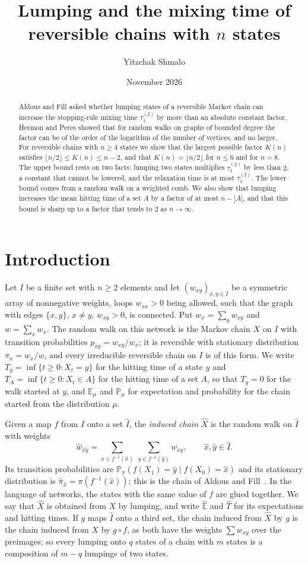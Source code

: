 \documentclass[11pt]{amsart}
\title[Lumping and the mixing time]{Lumping and the mixing time of reversible chains with $n$ states}
\author{Yitzchak Shmalo}
\date{November 2026}
\theoremstyle{definition}
\newcommand{\Prob}{\mathbb{P}}
\newcommand{\E}{\mathbb{E}}
\newcommand{\tmix}{\tau_1^{(2)}}
\newcommand{\hE}{\widehat{\E}}
\newcommand{\hw}{\widehat{w}}
\newcommand{\hpi}{\widehat{\pi}}
\newcommand{\hI}{\widehat{I}}
\newcommand{\hX}{\widehat{X}}
\begin{document}
\begin{abstract}
Aldous and Fill asked whether lumping states of a reversible Markov chain can increase the stopping-rule mixing time
$\tmix$ by more than an absolute constant factor. Hermon and Peres showed that for random walks on graphs of bounded
degree the factor can be of the order of the logarithm of the number of vertices, and no larger. For reversible
chains with $n\ge4$ states we show that the largest possible factor $K(n)$ satisfies
$\lfloor n/2\rfloor\le K(n)\le n-2$, and that $K(n)=\lfloor n/2\rfloor$ for $n\le6$ and for $n=8$. The upper bound
rests on two facts: lumping two states multiplies $\tmix$ by less than $2$, a constant that cannot be lowered, and the
relaxation time is at most $\tmix$. The lower bound comes from a random walk on a weighted comb. We also show that
lumping increases the mean hitting time of a set $A$ by a factor of at most $n-|A|$, and that this bound is sharp up to
a factor that tends to $2$ as $n\to\infty$.
\end{abstract}
\maketitle

\section{Introduction}\label{sec:intro}
Let $I$ be a finite set with $n\ge2$ elements and let $(w_{xy})_{x,y\in I}$ be a symmetric array of nonnegative
weights, loops $w_{xx}>0$ being allowed, such that the graph with edges $\{x,y\}$, $x\ne y$, $w_{xy}>0$, is connected.
Put $w_x=\sum_y w_{xy}$ and $w=\sum_x w_x$. The random walk on this network is the Markov chain $X$ on $I$ with
transition probabilities $p_{xy}=w_{xy}/w_x$; it is reversible with stationary distribution $\pi_x=w_x/w$, and every
irreducible reversible chain on $I$ is of this form. We write $T_y=\inf\{t\ge0:X_t=y\}$ for the hitting time of a
state $y$ and $T_A=\inf\{t\ge0:X_t\in A\}$ for the hitting time of a set $A$, so that $T_y=0$ for the walk started at
$y$, and $\E_\mu$ and $\Prob_\mu$ for expectation and probability for the chain started from the distribution $\mu$.

Given a map $f$ from $I$ onto a set $\hI$, the \emph{induced chain} $\hX$ is the random walk on $\hI$ with weights
\[
\hw_{\hat x\hat y}=\sum_{x\in f^{-1}(\hat x)}\ \sum_{y\in f^{-1}(\hat y)} w_{xy},\qquad \hat x,\hat y\in\hI .
\]
Its transition probabilities are $\Prob_\pi(f(X_1)=\hat y\mid f(X_0)=\hat x)$ and its stationary distribution is
$\hpi_{\hat x}=\pi(f^{-1}(\hat x))$; this is the chain of Aldous and Fill~\cite[Section~4.6.1]{AF}. In the language of
networks, the states with the same value of $f$ are glued together. We say that $\hX$ is obtained from $X$ by
lumping, and write $\hE$ and $\widehat{T}$ for its expectations and hitting times. If $g$ maps $\hI$ onto a third set,
the chain induced from $\hX$ by $g$ is the chain induced from $X$ by $g\circ f$, as both have the weights
$\sum w_{xy}$ over the preimages; so every lumping onto $q$ states of a chain with $m$ states is a composition of
$m-q$ lumpings of two states.
\end{document}
